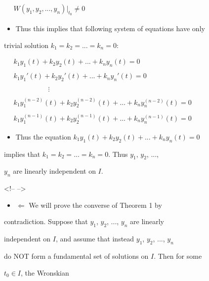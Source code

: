 $\begin{aligned} \quad W(y_1, y_2, ..., y_n)  \bigg|_{t_0} \neq 0 \end{aligned}$



\begin{itemize}
    \item Thus this implies that following system of equations have only
\end{itemize}
    trivial solution $k_1 = k_2 = ... = k_n = 0$:



$\begin{aligned} \quad k_1y_1(t) + k_2y_2(t) + ... + k_ny_n(t) = 0 \\\\ \quad k_1y_1'(t) + k_2y_2'(t) + ... + k_ny_n'(t) = 0 \\\\ \quad \quad \quad \quad \quad \quad \vdots \quad \quad \quad \quad \quad \quad \\\\ \quad k_1y_1^{(n-2)}(t) + k_2y_2^{(n-2)}(t) + ... + k_ny_n^{(n-2)}(t) = 0 \\\\ \quad k_1y_1^{(n-1)}(t) + k_2y_2^{(n-1)}(t) + ... + k_ny_n^{(n-1)}(t) = 0 \end{aligned}$



\begin{itemize}
    \item Thus the equation $k_1y_1(t) + k_2y_2(t) + ... + k_ny_n(t) = 0$
\end{itemize}
    implies that $k_1 = k_2 = ... = k_n = 0$. Thus $y_1$, $y_2$, ...,

    $y_n$ are linearly independent on $I$.



<!-- -->



\begin{itemize}
    \item $\Leftarrow$ We will prove the converse of Theorem 1 by
\end{itemize}
    contradiction. Suppose that $y_1$, $y_2$, ..., $y_n$ are linearly

    independent on $I$, and assume that instead $y_1$, $y_2$, ..., $y_n$

    do NOT form a fundamental set of solutions on $I$. Then for some

    $t_0 \in I$, the Wronskian

